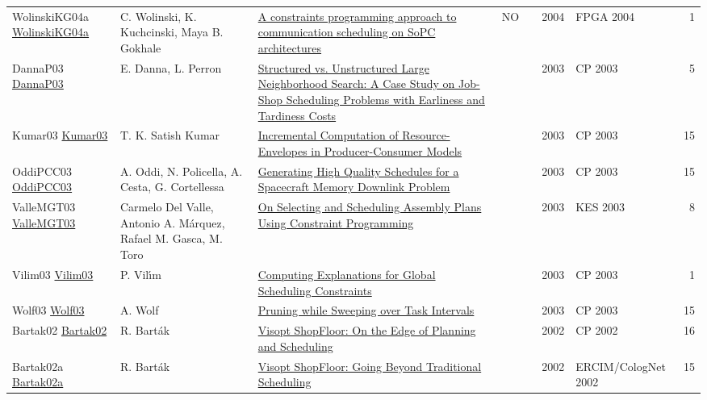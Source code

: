 {\begin{longtable}{p{3cm}p{6cm}p{7cm}rrrp{3cm}r}
WolinskiKG04a \href{https://doi.org/10.1145/968280.968336}{WolinskiKG04a} & C. Wolinski, K. Kuchcinski, Maya B. Gokhale & \href{papers/WolinskiKG04a.pdf}{A constraints programming approach to communication scheduling on SoPC architectures} & NO & \cite{WolinskiKG04a} & 2004 & FPGA 2004 & 1\\
DannaP03 \href{https://doi.org/10.1007/978-3-540-45193-8\_59}{DannaP03} & E. Danna, L. Perron & \href{papers/DannaP03.pdf}{Structured vs. Unstructured Large Neighborhood Search: {A} Case Study on Job-Shop Scheduling Problems with Earliness and Tardiness Costs} &  & \cite{DannaP03} & 2003 & CP 2003 & 5\\
Kumar03 \href{https://doi.org/10.1007/978-3-540-45193-8\_45}{Kumar03} & T. K. Satish Kumar & \href{papers/Kumar03.pdf}{Incremental Computation of Resource-Envelopes in Producer-Consumer Models} &  & \cite{Kumar03} & 2003 & CP 2003 & 15\\
OddiPCC03 \href{https://doi.org/10.1007/978-3-540-45193-8\_39}{OddiPCC03} & A. Oddi, N. Policella, A. Cesta, G. Cortellessa & \href{papers/OddiPCC03.pdf}{Generating High Quality Schedules for a Spacecraft Memory Downlink Problem} &  & \cite{OddiPCC03} & 2003 & CP 2003 & 15\\
ValleMGT03 \href{https://doi.org/10.1007/978-3-540-45226-3\_180}{ValleMGT03} & Carmelo Del Valle, Antonio A. M{\'{a}}rquez, Rafael M. Gasca, M. Toro & \href{papers/ValleMGT03.pdf}{On Selecting and Scheduling Assembly Plans Using Constraint Programming} &  & \cite{ValleMGT03} & 2003 & KES 2003 & 8\\
Vilim03 \href{https://doi.org/10.1007/978-3-540-45193-8\_124}{Vilim03} & P. Vil{\'{\i}}m & \href{papers/Vilim03.pdf}{Computing Explanations for Global Scheduling Constraints} &  & \cite{Vilim03} & 2003 & CP 2003 & 1\\
Wolf03 \href{https://doi.org/10.1007/978-3-540-45193-8\_50}{Wolf03} & A. Wolf & \href{papers/Wolf03.pdf}{Pruning while Sweeping over Task Intervals} &  & \cite{Wolf03} & 2003 & CP 2003 & 15\\
Bartak02 \href{https://doi.org/10.1007/3-540-46135-3\_39}{Bartak02} & R. Bart{\'{a}}k & \href{papers/Bartak02.pdf}{Visopt ShopFloor: On the Edge of Planning and Scheduling} &  & \cite{Bartak02} & 2002 & CP 2002 & 16\\
Bartak02a \href{https://doi.org/10.1007/3-540-36607-5\_14}{Bartak02a} & R. Bart{\'{a}}k & \href{papers/Bartak02a.pdf}{Visopt ShopFloor: Going Beyond Traditional Scheduling} &  & \cite{Bartak02a} & 2002 & ERCIM/CologNet 2002 & 15\\

\end{longtable}}
